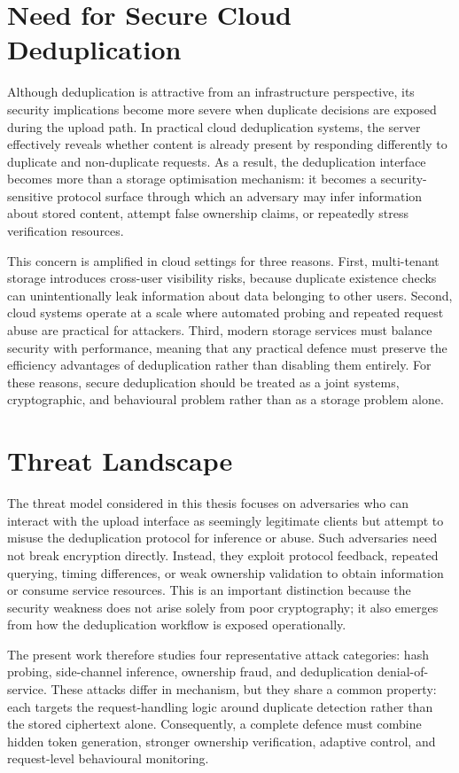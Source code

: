 \documentclass[12pt,a4paper,oneside]{report}
\begin{document}
\section{Need for Secure Cloud Deduplication}

Although deduplication is attractive from an infrastructure perspective, its security implications become more severe when duplicate decisions are exposed during the upload path.
In practical cloud deduplication systems, the server effectively reveals whether content is already present by responding differently to duplicate and non-duplicate requests.
As a result, the deduplication interface becomes more than a storage optimisation mechanism: it becomes a security-sensitive protocol surface through which an adversary may infer information about stored content, attempt false ownership claims, or repeatedly stress verification resources.

This concern is amplified in cloud settings for three reasons.
First, multi-tenant storage introduces cross-user visibility risks, because duplicate existence checks can unintentionally leak information about data belonging to other users.
Second, cloud systems operate at a scale where automated probing and repeated request abuse are practical for attackers.
Third, modern storage services must balance security with performance, meaning that any practical defence must preserve the efficiency advantages of deduplication rather than disabling them entirely.
For these reasons, secure deduplication should be treated as a joint systems, cryptographic, and behavioural problem rather than as a storage problem alone.

\section{Threat Landscape}

The threat model considered in this thesis focuses on adversaries who can interact with the upload interface as seemingly legitimate clients but attempt to misuse the deduplication protocol for inference or abuse.
Such adversaries need not break encryption directly.
Instead, they exploit protocol feedback, repeated querying, timing differences, or weak ownership validation to obtain information or consume service resources.
This is an important distinction because the security weakness does not arise solely from poor cryptography; it also emerges from how the deduplication workflow is exposed operationally.

The present work therefore studies four representative attack categories: hash probing, side-channel inference, ownership fraud, and deduplication denial-of-service.
These attacks differ in mechanism, but they share a common property: each targets the request-handling logic around duplicate detection rather than the stored ciphertext alone.
Consequently, a complete defence must combine hidden token generation, stronger ownership verification, adaptive control, and request-level behavioural monitoring.
\end{document}
